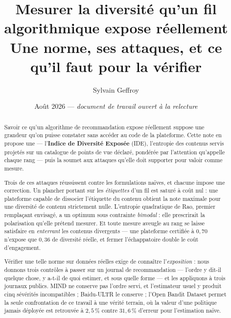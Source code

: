 \documentclass[11pt,a4paper]{article}
\title{\textbf{Mesurer la diversité qu'un fil algorithmique expose réellement}\\[2mm]
       \large Une norme, ses attaques, et ce qu'il faut pour la vérifier}
\author{Sylvain Geffroy}
\date{Août 2026 --- \emph{document de travail ouvert à la relecture}}
\begin{document}
\maketitle

\begin{abstract}
\noindent
Savoir ce qu'un algorithme de recommandation expose réellement suppose une grandeur qu'on
puisse constater sans accéder au code de la plateforme. Cette note en propose une ---
l'\textbf{Indice de Diversité Exposée} (IDE), l'entropie des contenus servis projetés sur un
catalogue de points de vue déclaré, pondérée par l'attention qu'appelle chaque rang --- puis la
soumet aux attaques qu'elle doit supporter pour valoir comme mesure.

Trois de ces attaques réussissent contre les formulations naïves, et chacune impose une
correction. Un plancher portant sur les \emph{étiquettes} d'un fil est saturé à coût nul :
une plateforme capable de dissocier l'étiquette du contenu obtient la note maximale pour une
diversité de contenu strictement nulle. L'entropie quadratique de Rao, premier remplaçant
envisagé, a un optimum sous contrainte \emph{bimodal} : elle prescrirait la polarisation
qu'elle prétend mesurer. Et toute mesure aveugle au rang se laisse satisfaire en
\emph{enterrant} les contenus divergents --- une plateforme certifiée à $0{,}70$ n'expose
que $0{,}36$ de diversité réelle, et fermer l'échappatoire double le coût d'engagement.

Vérifier une telle norme sur données réelles exige de connaître l'\emph{exposition} : nous
donnons trois contrôles à passer sur un journal de recommandation --- l'ordre y dit-il quelque
chose, y a-t-il de quoi estimer, et sous quelle forme --- et les appliquons à trois journaux
publics. MIND ne conserve pas l'ordre servi, et l'estimateur usuel y produit cinq sévérités
incompatibles ; Baidu-ULTR le conserve ; l'Open Bandit Dataset permet la seule confrontation de
ce travail à une vérité terrain, où la valeur d'une politique jamais déployée est retrouvée à
$2{,}5\,\%$ contre $31{,}6\,\%$ d'erreur pour l'estimation naïve.


\end{abstract}
\end{document}
